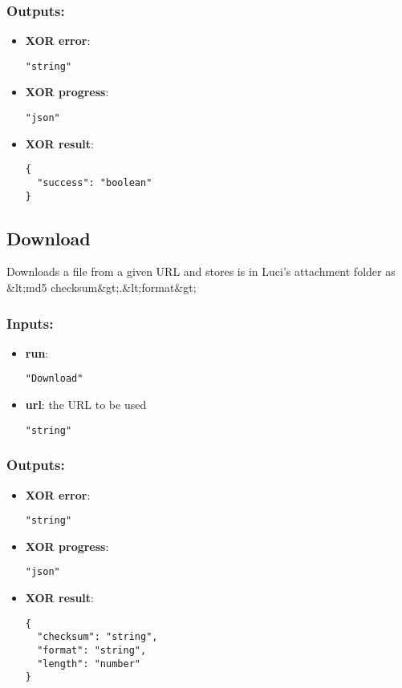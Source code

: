 \subsubsection*{Outputs:}
\begin{itemize}
    \item \textbf{XOR error}: 
\begin{lstlisting}
"string"
\end{lstlisting}
    \item \textbf{XOR progress}: 
\begin{lstlisting}
"json"
\end{lstlisting}
    \item \textbf{XOR result}: 
\begin{lstlisting}
{
  "success": "boolean"
}
\end{lstlisting}
  \end{itemize}

\subsection{Download}
Downloads
 a file from a given URL and stores is in Luci's attachment folder as 
\&lt;md5 checksum\&gt;.\&lt;format\&gt; 
\subsubsection*{Inputs:}
\begin{itemize}
    \item \textbf{run}: 
\begin{lstlisting}
"Download"
\end{lstlisting}
    \item \textbf{url}: the URL to be used
\begin{lstlisting}
"string"
\end{lstlisting}
  \end{itemize}

\subsubsection*{Outputs:}
\begin{itemize}
    \item \textbf{XOR error}: 
\begin{lstlisting}
"string"
\end{lstlisting}
    \item \textbf{XOR progress}: 
\begin{lstlisting}
"json"
\end{lstlisting}
    \item \textbf{XOR result}: 
\begin{lstlisting}
{
  "checksum": "string", 
  "format": "string", 
  "length": "number"
}
\end{lstlisting}
  \end{itemize}

